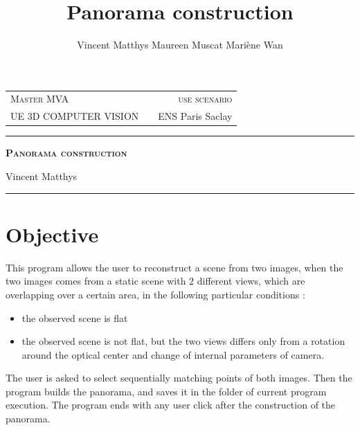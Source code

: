 \documentclass[12pt,a4paper,onecolumn]{article}
\title{Panorama construction}
\author{Vincent Matthys Maureen Muscat Mariène Wan}
\begin{document}
\begin{tabularx}{\textwidth}{@{} l X r @{} }
{\textsc{Master MVA}} & & \textsc{use scenario}\\
\textsc{UE 3D COMPUTER VISION} & &{ENS Paris Saclay}\\
\end{tabularx}
\vspace{1.5cm}
\begin{center}

\rule[11pt]{5cm}{0.5pt}

\textbf{\LARGE \textsc{Panorama construction}}
\vspace{0.5cm}

Vincent Matthys


\rule{5cm}{0.5pt}

\vspace{1.5cm}
\end{center}

\section{Objective}
This program allows the user to reconstruct a scene from two images, when the two images comes from a static scene with 2 different views, which are overlapping over a certain area, in the following particular conditions :
\begin{itemize}
\item the observed scene is flat
\item the observed scene is not flat, but the two views differs only from a rotation around the optical center and change of internal parameters of camera.
\end{itemize}
The user is asked to select sequentially matching points of both images. Then the program builds the panorama, and saves it in the folder of current program execution. The program ends with any user click after the construction of the panorama.
\end{document}

